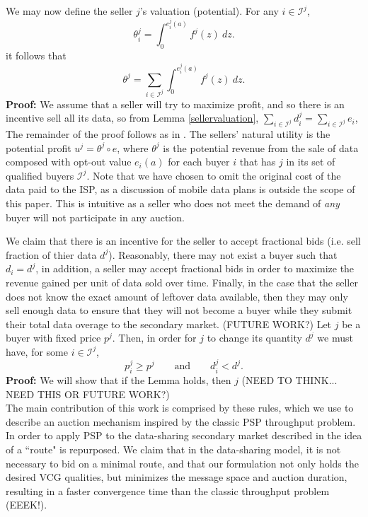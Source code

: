 \documentclass[12pt]{article}
\theoremstyle{definition}
\newcommand{\mcI}{\mathcal{I}}
\begin{document}
\begin{multicols}{2}
We may now define the seller $j$'s valuation (potential). 
{
\label{sellervaluation}
For any $i\in\mcI^j$, 
\begin{equation}
    \theta_i^j = \int_0^{e_i^j(a)} f^j(z) \ dz.
\end{equation}
it follows that 
\begin{equation}\label{valuation}
    \theta^j = \displaystyle\sum_{i\in\mcI^j}
 \int_0^{e_i^j(a)} f^j(z) \ dz.
\end{equation}
}
\textbf{Proof:} 
We assume that a seller will try to maximize profit, and
so there is an incentive sell all its data, so from Lemma
\ref{sellervaluation},  $\sum_{i\in{\mcI^j}} d_i^j = 
\sum_{i\in\mcI^j} e_i$,
The remainder of the proof follows as in \cite{semret}.
The sellers' natural utility is the potential
profit $u^j = \theta^j\circ e$, where $\theta^j$ is the
potential revenue from the sale of data composed with opt-out value
$e_i(a)$ for each buyer $i$ that has $j$ in its set of qualified buyers
$\mcI^j$. Note that we have chosen to omit the original cost of the data
paid to the ISP, as a discussion of mobile data plans is outside the scope of this
paper. This is intuitive as a seller who does not meet the demand of \emph{any} buyer will not
participate in any auction. 

We claim that there is an incentive for the seller to
accept fractional bids (i.e. sell fraction of thier data $d^j$). Reasonably,
there may not exist a buyer such that $d_i = d^j$, in addition, a seller may accept
fractional bids in order to
maximize the revenue gained per unit of data sold over time.
Finally, in the case that the seller does not know the exact amount of
leftover data available, then they may only sell enough data to ensure that
they will not become a buyer while they submit their total data overage to the
secondary market. (FUTURE WORK?)
{
\label{incentive}
Let $j$ be a buyer with fixed price $p^j$. Then, in order for $j$ to change its
quantity $d^j$ we must have, for some $i \in \mcI^j$,
\begin{equation}
       p_i^j \ge p^j \qquad \text{and} \qquad d_i^j < d^j.
\end{equation}
}
\textbf{Proof:}
We will show that if the Lemma holds, then $j$
(NEED TO THINK... NEED THIS OR FUTURE WORK?)\\

The main contribution of this work is comprised by these rules, which we use to
describe an auction mechanism inspired by the classic PSP throughput problem. In order to apply PSP to the data-sharing secondary market described in
\cite{zheng} the idea of a ``route" is repurposed. We claim that in the
data-sharing model, it is not necessary to bid on a minimal route, and that our
formulation not only holds the desired VCG qualities, but minimizes the message
space and auction duration, resulting in a faster convergence time than the
classic throughput problem (EEEK!).



\end{multicols}
\end{document}
